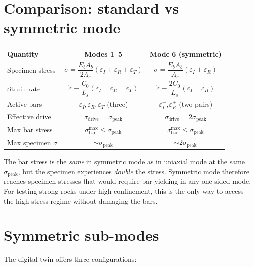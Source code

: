 \documentclass[11pt,a4paper,openany]{book}
\theoremstyle{handbook}
\newcommand{\sig}{\sigma}
\newcommand{\eps}{\varepsilon}
\newcommand{\epsdot}{\dot\eps}
\newcommand{\Cz}{C_0}
\newcommand{\Ab}{A_b}
\newcommand{\As}{A_s}
\newcommand{\Ls}{L_s}
\newcommand{\sigpeak}{\sig_{\text{peak}}}
\begin{document}
\section{Comparison: standard vs symmetric mode}

\begin{center}
\renewcommand{\arraystretch}{1.4}
\begin{tabular}{@{}lcc@{}}
\toprule
\textbf{Quantity} & \textbf{Modes 1--5} & \textbf{Mode 6 (symmetric)}\\
\midrule
Specimen stress
  & $\sig=\dfrac{E_b\Ab}{2\As}(\eps_I+\eps_R+\eps_T)$
  & $\sig=\dfrac{E_b\Ab}{\As}(\eps_I+\eps_R)$\\
Strain rate
  & $\epsdot=\dfrac{\Cz}{\Ls}(\eps_I-\eps_R-\eps_T)$
  & $\epsdot=\dfrac{2\Cz}{\Ls}(\eps_I-\eps_R)$\\
Active bars
  & $\eps_I,\eps_R,\eps_T$ (three)
  & $\eps_I^{\pm},\eps_R^{\pm}$ (two pairs)\\
Effective drive
  & $\sig_{\text{drive}}=\sigpeak$
  & $\sig_{\text{drive}}=2\sigpeak$\\
Max bar stress
  & $\sig_{\text{bar}}^{\max}\le\sigpeak$
  & $\sig_{\text{bar}}^{\max}\le\sigpeak$\\
Max specimen $\sig$
  & $\sim\sigpeak$
  & $\sim 2\sigpeak$\\
\bottomrule
\end{tabular}
\end{center}

\begin{warningbox}
The bar stress is the \emph{same} in symmetric mode as in uniaxial mode at
the same $\sigpeak$, but the specimen experiences \emph{double} the stress.
Symmetric mode therefore reaches specimen stresses that would require bar
yielding in any one-sided mode. For testing strong rocks under high
confinement, this is the only way to access the high-stress regime without
damaging the bars.
\end{warningbox}

\section{Symmetric sub-modes}

The digital twin offers three configurations:
\end{document}
